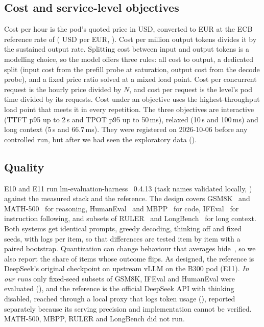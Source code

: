 \subsection{Cost and service-level objectives}
Cost per hour is the pod's quoted price in USD, converted to EUR at the ECB reference rate of 
( USD per EUR, ). Cost per million output tokens divides
it by the sustained output rate. Splitting cost between input and output tokens is a modelling choice, so the model
offers three rules: all cost to output, a dedicated split (input cost from the prefill probe at saturation, output cost
from the decode probe), and a fixed price ratio solved at a mixed load point. Cost per concurrent request is the hourly
price divided by $N$, and cost per request is the level's pod time divided by its requests. Cost under an objective
uses the highest-throughput load point that meets it in every repetition. The three objectives are interactive (TTFT
p95 up to 2\,s and TPOT p95 up to 50\,ms), relaxed (10\,s and 100\,ms) and long context (5\,s and 66.7\,ms). They
were registered on 2026-10-06 before any controlled run, but after we had seen the exploratory data
().

\subsection{Quality}
E10 and E11 run lm-evaluation-harness~\citep{sutawika2023lmeval} 0.4.13 (task names validated locally,
) against the measured stack and the reference. The design covers GSM8K~\citep{cobbe2021gsm8k}
and MATH-500~\citep{hendrycks2021math} for reasoning, HumanEval~\citep{chen2021humaneval} and MBPP~\citep{austin2021mbpp}
for code, IFEval~\citep{zhou2023ifeval} for instruction following, and subsets of RULER~\citep{hsieh2024ruler} and
LongBench~\citep{bai2024longbench} for long context. Both systems get identical prompts, greedy decoding, thinking off
and fixed seeds, with logs per item, so that differences are tested item by item with a paired bootstrap. Quantization
can change behaviour that averages hide~\citep{dutta2024accuracy}, so we also report the share of items whose outcome
flips. As designed, the reference is DeepSeek's original checkpoint on upstream vLLM on the B300 pod (E11). \emph{In
our runs} only fixed-seed subsets of GSM8K, IFEval and HumanEval were evaluated
(), and the reference is the official DeepSeek API with thinking
disabled, reached through a local proxy that logs token usage (), reported separately
because its serving precision and implementation cannot be verified. MATH-500, MBPP, RULER and LongBench did not run.

